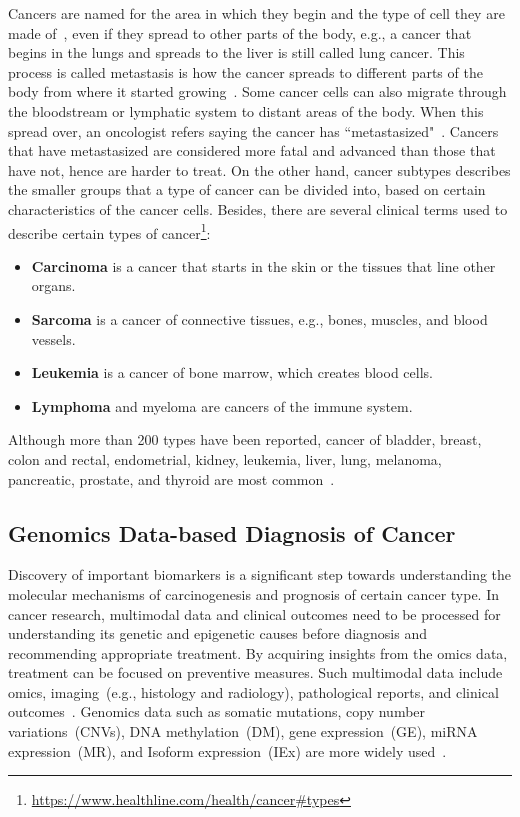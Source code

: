 \hspace*{3.5mm} Cancers are named for the area in which they begin and the type of cell they are made of~\cite{19Cruz}, even if they spread to other parts of the body, e.g., a cancer that begins in the lungs and spreads to the liver is still called lung cancer. This process is called metastasis is how the cancer spreads to  different parts of the body from where it started growing~\cite{13cancerdef}. Some cancer cells can also migrate through the bloodstream or lymphatic system to distant areas of the body. When this spread over, an oncologist refers saying the cancer has ``metastasized"~\cite{22Ding}. Cancers that have metastasized are considered more fatal and advanced than those that have not, hence are harder to treat. On the other hand, cancer subtypes describes the smaller groups that a type of cancer can be divided into, based on certain characteristics of the cancer cells. Besides, there are several clinical terms used to describe certain types of cancer\footnote{\url{https://www.healthline.com/health/cancer\#types}}:

\begin{itemize}[noitemsep]
    \item \textbf{Carcinoma} is a cancer that starts in the skin or the tissues that line other organs.
    \item \textbf{Sarcoma} is a cancer of connective tissues, e.g., bones, muscles, and blood vessels.
    \item \textbf{Leukemia} is a cancer of bone marrow, which creates blood cells.
    \item \textbf{Lymphoma} and myeloma are cancers of the immune system.
\end{itemize} 

\hspace*{3.5mm} Although more than 200 types have been reported, cancer of bladder, breast, colon and rectal, endometrial, kidney, leukemia, liver, lung, melanoma, pancreatic, prostate, and thyroid are most common~\cite{71Torre}. 

\subsection{Genomics Data-based Diagnosis of Cancer}
Discovery of important biomarkers is a significant step towards understanding the molecular mechanisms of carcinogenesis and prognosis of certain cancer type. In cancer research, multimodal data and clinical outcomes need to be processed for understanding its genetic and epigenetic causes before diagnosis and recommending appropriate treatment. By acquiring insights from the omics data, treatment can be focused on preventive measures. Such multimodal data include omics, imaging~(e.g., histology and radiology), pathological reports, and clinical outcomes~\cite{22Ding, 23Zheng}. Genomics data such as somatic mutations, copy number variations~(CNVs), DNA methylation~(DM), gene expression~(GE), miRNA expression~(MR), and Isoform expression~(IEx) are more widely used~\cite{yates, ncbi1,ncbi2, kozomara1,kozomara2}.  

